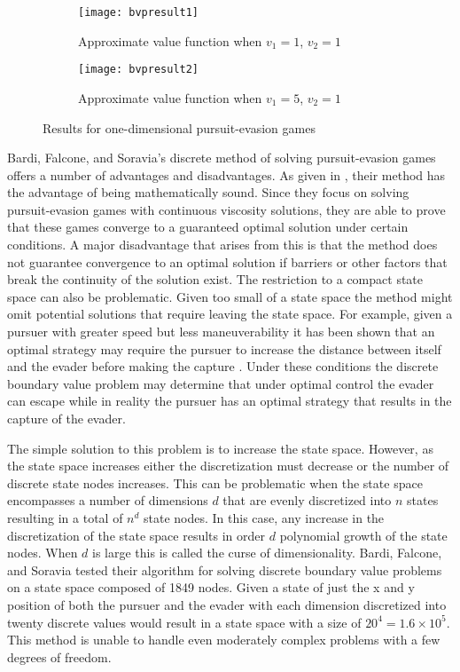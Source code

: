 \begin{figure}[h!]
\centering
\begin{subfigure}[t]{0.475\textwidth}
	\centering
	\texttt{[image: bvpresult1]}
	\caption{Approximate value function when $v_1 = 1$, $v_2 = 1$}
	\label{bvpresult1}
\end{subfigure}
\hfill
\begin{subfigure}[t]{0.475\textwidth}
	\centering
	\texttt{[image: bvpresult2]}
	\caption{Approximate value function when $v_1 = 5$, $v_2 = 1$}
	\label{bvpresult2}
\end{subfigure}
\caption{Results for one-dimensional pursuit-evasion games \cite{bardi2}}
\label{bvpresults}
\end{figure}
   
Bardi, Falcone, and Soravia's discrete method of solving pursuit-evasion games offers a number of advantages and disadvantages. As given in , their method has the advantage of being mathematically sound. Since they focus on solving pursuit-evasion games with continuous viscosity solutions, they are able to prove that these games converge to a guaranteed optimal solution under certain conditions. A major disadvantage that arises from this is that the method does not guarantee convergence to an optimal solution if barriers or other factors that break the continuity of the solution exist. The restriction to a compact state space can also be problematic. Given too small of a state space the method might omit potential solutions that require leaving the state space. For example, given a pursuer with greater speed but less maneuverability it has been shown that an optimal strategy may require the pursuer to increase the distance between itself and the evader before making the capture \cite{isaacs}. Under these conditions the discrete boundary value problem may determine that under optimal control the evader can escape while in reality the pursuer has an optimal strategy that results in the capture of the evader.

The simple solution to this problem is to increase the state space. However, as the state space increases either the discretization must decrease or the number of discrete state nodes increases. This can be problematic when the state space encompasses a number of dimensions $d$ that are evenly discretized into $n$ states resulting in a total of $n^d$ state nodes. In this case, any increase in the discretization of the state space results in order $d$ polynomial growth of the state nodes. When $d$ is large this is called the curse of dimensionality. Bardi, Falcone, and Soravia tested their algorithm for solving discrete boundary value problems on a state space composed of 1849 nodes. Given a state of just the x and y position of both the pursuer and the evader with each dimension discretized into twenty discrete values would result in a state space with a size of $20^4 = 1.6 \times 10^5$. This method is unable to handle even moderately complex problems with a few degrees of freedom. 

